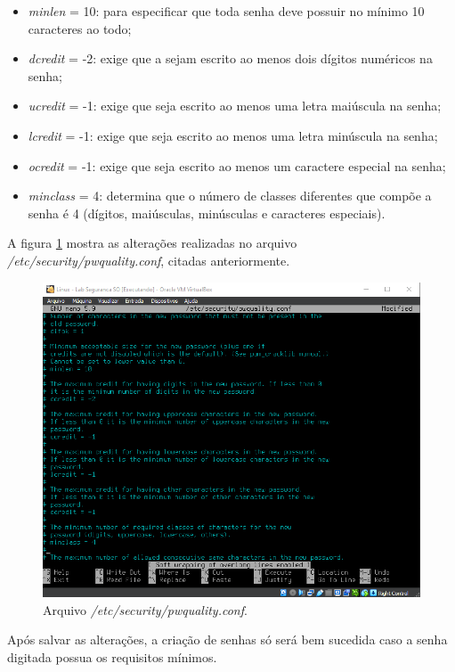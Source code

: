\documentclass[
	12pt,				%
	oneside,   	        %
	a4paper,			%
	english,			%
	french,				%
	spanish,			%
	brazil,				%
	]{pacotes/abntex2}
\begin{document}
\begin{itemize}
    \item \textit{minlen} = 10: para especificar que toda senha deve possuir no mínimo 10 caracteres ao todo;
    \item \textit{dcredit} = -2: exige que a sejam escrito ao menos dois dígitos numéricos na senha;
    \item \textit{ucredit} = -1: exige que seja escrito ao menos uma letra maiúscula na senha;
    \item \textit{lcredit} = -1: exige que seja escrito ao menos uma letra minúscula na senha;
    \item \textit{ocredit} = -1: exige que seja escrito ao menos um caractere especial na senha;
    \item \textit{minclass} = 4: determina que o número de classes diferentes que compõe a senha é 4 (dígitos, maiúsculas, minúsculas e caracteres especiais).
\end{itemize}

A figura \ref{fig:pwquality} mostra as alterações realizadas no arquivo \textit{/etc/security/pwquality.conf}, citadas anteriormente.

\begin{figure}[H]
  \centering
  \includegraphics[scale=0.7]{figuras/nano_pwquality.png}
  \caption{Arquivo \textit{/etc/security/pwquality.conf}.}
  \label{fig:pwquality}
\end{figure}

Após salvar as alterações, a criação de senhas só será bem sucedida caso a senha digitada possua os requisitos mínimos.
\end{document}
